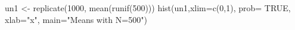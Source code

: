 \begin{Schunk}
\begin{Sinput}
  un1 <- replicate(1000, mean(runif(500)))
  hist(un1,xlim=c(0,1), prob= TRUE, xlab="x", main="Means with N=500")
\end{Sinput}
\end{Schunk}
